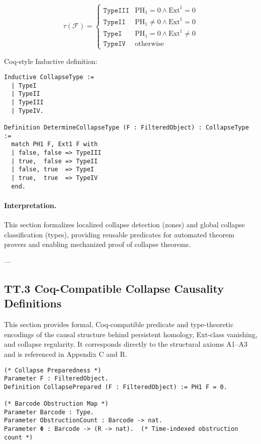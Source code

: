 \documentclass[11pt]{article}
\begin{document}
{\[
\tau(\mathcal{F}) =
\begin{cases}
\texttt{TypeIII} & \mathrm{PH}_1 = 0 \land \mathrm{Ext}^1 = 0 \\
\texttt{TypeII} & \mathrm{PH}_1 \ne 0 \land \mathrm{Ext}^1 = 0 \\
\texttt{TypeI} & \mathrm{PH}_1 = 0 \land \mathrm{Ext}^1 \ne 0 \\
\texttt{TypeIV} & \text{otherwise}
\end{cases}
\]

Coq-style Inductive definition:

\begin{lstlisting}[language=Coq]
Inductive CollapseType :=
  | TypeI
  | TypeII
  | TypeIII
  | TypeIV.

Definition DetermineCollapseType (F : FilteredObject) : CollapseType :=
  match PH1 F, Ext1 F with
  | false, false => TypeIII
  | true,  false => TypeII
  | false, true  => TypeI
  | true,  true  => TypeIV
  end.
\end{lstlisting}

\paragraph{Interpretation.}
This section formalizes localized collapse detection (zones) and global collapse classification (types),  
providing reusable predicates for automated theorem provers and enabling mechanized proof of collapse theorems.

---

\subsection*{TT.3 Coq-Compatible Collapse Causality Definitions}

This section provides formal, Coq-compatible predicate and type-theoretic encodings  
of the causal structure behind persistent homology, Ext-class vanishing, and collapse regularity.  
It corresponds directly to the structural axioms A1–A3 and is referenced in Appendix C and R.

\begin{lstlisting}[language=Coq]
(* Collapse Preparedness *)
Parameter F : FilteredObject.
Definition CollapsePrepared (F : FilteredObject) := PH1 F = 0.

(* Barcode Obstruction Map *)
Parameter Barcode : Type.
Parameter ObstructionCount : Barcode -> nat.
Parameter Φ : Barcode -> (R -> nat).  (* Time-indexed obstruction count *)


\end{lstlisting}}
\end{document}
